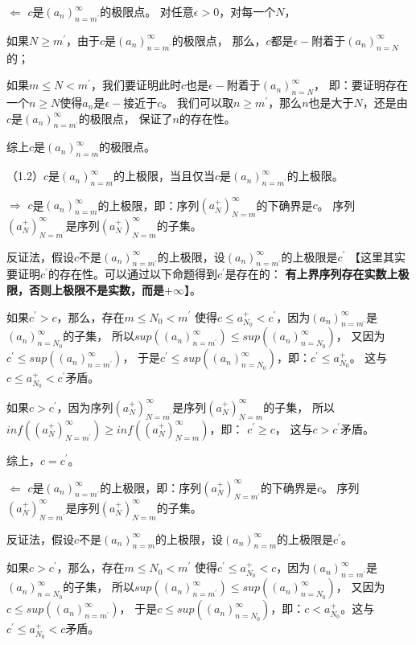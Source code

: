 \documentclass{article}
\theoremstyle{mystyle}
\begin{document}
\textbf{$\Leftarrow$} $c$是$(a_n)_{n=m^\prime}^\infty$的极限点。
对任意$\epsilon > 0$，对每一个$N$，

如果$N \geq m^\prime$，由于$c$是$(a_n)_{n=m^\prime}^\infty$的极限点，
那么，$c$都是$\epsilon-$附着于$(a_n)_{n=N}^\infty$的；

如果$m \leq N < m^\prime$，我们要证明此时$c$也是$\epsilon-$附着于$(a_n)_{n=N}^\infty$，
即：要证明存在一个$n \geq N$使得$a_n$是$\epsilon-$接近于$c$。
我们可以取$n \geq m^\prime$，那么$n$也是大于$N$，还是由$c$是$(a_n)_{n=m^\prime}^\infty$的极限点，
保证了$n$的存在性。

综上$c$是$(a_n)_{n=m}^\infty$的极限点。

（1.2）$c$是$(a_n)_{n=m}^\infty$的上极限，当且仅当$c$是$(a_n)_{n=m^\prime}^\infty$的上极限。

\textbf{$\Rightarrow$} $c$是$(a_n)_{n=m}^\infty$的上极限，即：序列$(a_N^+)_{N=m}^\infty$的下确界是$c$。
序列$(a_N^+)_{N=m^\prime}^\infty$是序列$(a_N^+)_{N=m}^\infty$的子集。

反证法，假设$c$不是$(a_n)_{n=m^\prime}^\infty$的上极限，设$(a_n)_{n=m^\prime}^\infty$的上极限是$c^\prime$
【这里其实要证明$c^\prime$的存在性。可以通过以下命题得到$c^\prime$是存在的：
\textbf{有上界序列存在实数上极限，否则上极限不是实数，而是$+\infty$}】。

如果$c^\prime > c$，那么，存在$m \leq N_0 < m^\prime$
使得$c \leq a_{N_0}^+ < c^\prime$，因为$(a_n)_{n=m^\prime}^\infty$是$(a_n)_{n=N_0}^\infty$的子集，
所以$sup((a_n)_{n=m^\prime}^\infty) \leq sup((a_n)_{n=N_0}^\infty)$，
又因为$c^\prime \leq sup((a_n)_{n=m^\prime}^\infty)$，
于是$c^\prime \leq sup((a_n)_{n=N_0}^\infty)$，即：$c^\prime \leq a_{N_0}^+$。
这与$c \leq a_{N_0}^+ < c^\prime$矛盾。

如果$c > c^\prime$，因为序列$(a_N^+)_{N=m^\prime}^\infty$是序列$(a_N^+)_{N=m}^\infty$的子集，
所以$inf((a_N^+)_{N=m^\prime}^\infty) \geq inf((a_N^+)_{N=m}^\infty)$，即： $c^\prime \geq c$，
这与$c > c^\prime$矛盾。

综上，$c = c^\prime$。

\textbf{$\Leftarrow$} $c$是$(a_n)_{n=m^\prime}^\infty$的上极限，即：序列$(a_N^+)_{N=m^\prime}^\infty$的下确界是$c$。
序列$(a_N^+)_{N=m^\prime}^\infty$是序列$(a_N^+)_{N=m}^\infty$的子集。

反证法，假设$c$不是$(a_n)_{n=m}^\infty$的上极限，设$(a_n)_{n=m}^\infty$的上极限是$c^\prime$。

如果$c > c^\prime$，那么，存在$m \leq N_0 < m^\prime$
使得$c^\prime \leq a_{N_0}^+ < c$，因为$(a_n)_{n=m^\prime}^\infty$是$(a_n)_{n=N_0}^\infty$的子集，
所以$sup((a_n)_{n=m^\prime}^\infty) \leq sup((a_n)_{n=N_0}^\infty)$，
又因为$c \leq sup((a_n)_{n=m^\prime}^\infty)$，
于是$c \leq sup((a_n)_{n=N_0}^\infty)$，即：$c < a_{N_0}^+$。这与$c^\prime \leq a_{N_0}^+ < c$矛盾。
\end{document}
